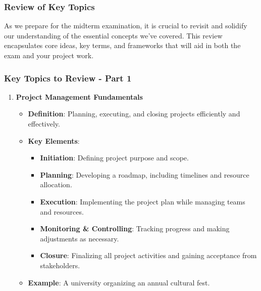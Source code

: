 \documentclass[aspectratio=169]{beamer}
\begin{document}
\begin{frame}[fragile]
    \frametitle{Review of Key Topics}
    As we prepare for the midterm examination, it is crucial to revisit and solidify our understanding of the essential concepts we've covered. This review encapsulates core ideas, key terms, and frameworks that will aid in both the exam and your project work.
\end{frame}

\begin{frame}[fragile]
    \frametitle{Key Topics to Review - Part 1}
    \begin{enumerate}
        \item \textbf{Project Management Fundamentals}
            \begin{itemize}
                \item \textbf{Definition}: Planning, executing, and closing projects efficiently and effectively.
                \item \textbf{Key Elements}:
                    \begin{itemize}
                        \item \textbf{Initiation}: Defining project purpose and scope.
                        \item \textbf{Planning}: Developing a roadmap, including timelines and resource allocation.
                        \item \textbf{Execution}: Implementing the project plan while managing teams and resources.
                        \item \textbf{Monitoring \& Controlling}: Tracking progress and making adjustments as necessary.
                        \item \textbf{Closure}: Finalizing all project activities and gaining acceptance from stakeholders.
                    \end{itemize}
                \item \textbf{Example}: A university organizing an annual cultural fest.
            \end{itemize}
    \end{enumerate}
\end{frame}
\end{document}
